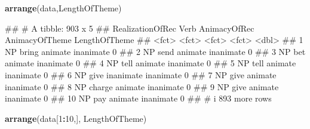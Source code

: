 \documentclass[
]{book}
\newenvironment{Shaded}{\begin{snugshade}}{\end{snugshade}}
\newcommand{\DecValTok}[1]{\textcolor[rgb]{0.00,0.00,0.81}{#1}}
\newcommand{\FunctionTok}[1]{\textcolor[rgb]{0.13,0.29,0.53}{\textbf{#1}}}
\newcommand{\NormalTok}[1]{#1}
\newcommand{\SpecialCharTok}[1]{\textcolor[rgb]{0.81,0.36,0.00}{\textbf{#1}}}
\begin{document}
\begin{Shaded}
\begin{Highlighting}[]
\FunctionTok{arrange}\NormalTok{(data,LengthOfTheme)}
\end{Highlighting}
\end{Shaded}

\begin{Shaded}
\begin{Highlighting}[]
\NormalTok{\#\# \# A tibble: 903 x 5}
\NormalTok{\#\#    RealizationOfRec Verb   AnimacyOfRec AnimacyOfTheme LengthOfTheme}
\NormalTok{\#\#    \textless{}fct\textgreater{}            \textless{}fct\textgreater{}  \textless{}fct\textgreater{}        \textless{}fct\textgreater{}                  \textless{}dbl\textgreater{}}
\NormalTok{\#\#  1 NP               bring  animate      inanimate                  0}
\NormalTok{\#\#  2 NP               send   animate      inanimate                  0}
\NormalTok{\#\#  3 NP               bet    animate      inanimate                  0}
\NormalTok{\#\#  4 NP               tell   animate      inanimate                  0}
\NormalTok{\#\#  5 NP               tell   animate      inanimate                  0}
\NormalTok{\#\#  6 NP               give   inanimate    inanimate                  0}
\NormalTok{\#\#  7 NP               give   animate      inanimate                  0}
\NormalTok{\#\#  8 NP               charge animate      inanimate                  0}
\NormalTok{\#\#  9 NP               give   animate      inanimate                  0}
\NormalTok{\#\# 10 NP               pay    animate      inanimate                  0}
\NormalTok{\#\# \# i 893 more rows}
\end{Highlighting}
\end{Shaded}

\begin{Shaded}
\begin{Highlighting}[]
\FunctionTok{arrange}\NormalTok{(data[}\DecValTok{1}\SpecialCharTok{:}\DecValTok{10}\NormalTok{,], LengthOfTheme)}
\end{Highlighting}
\end{Shaded}
\end{document}
